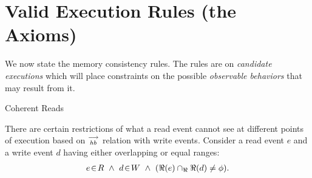         
    \section{Valid Execution Rules (the Axioms)}
        We now state the memory consistency rules. 
        The rules are on \textit{candidate executions} which will place constraints on the possible \textit{observable behaviors} that may result from it. 
         
        \begin{axiom}{Coherent Reads} 
            \label{CoRe}
        
            There are certain restrictions of what a read event cannot see at different points of execution based on $\stackrel{\longrightarrow}{_{hb}}$ relation with write events. 
            Consider a read event $e$ and a write event $d$ having either overlapping or equal ranges:
            \begin{align*}
                \event{e}{R} \ \wedge \ 
                \event{d}{W} \ \wedge \
                (\Re(e) \cap_\Re \Re(d) \neq \phi).
            \end{align*}


\end{axiom}
